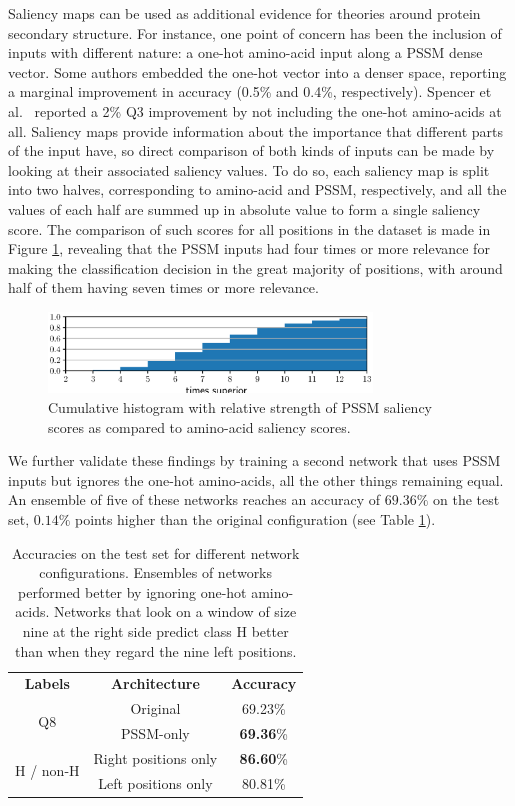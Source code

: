 \documentclass{article}
\begin{document}
Saliency maps can be used as additional evidence for theories around protein secondary structure.
For instance, one point of concern has been the inclusion of inputs with different nature: a one-hot amino-acid input along a PSSM dense vector.
Some authors \cite{Li2016,Zhou2018} embedded the one-hot vector into a denser space, reporting a marginal improvement in accuracy (0.5\% and 0.4\%, respectively).
Spencer et al.~\cite{Spencer2015} reported a 2\% Q3 improvement by not including the one-hot amino-acids at all.
Saliency maps provide information about the importance that different parts of the input have, so direct comparison of both kinds of inputs can be made by looking at their associated saliency values.
To do so, each saliency map is split into two halves, corresponding to amino-acid and PSSM, respectively, and all the values of each half are summed up in absolute value to form a single saliency score.
The comparison of such scores for all positions in the dataset is made in Figure \ref{fig:aa_pssm}, revealing that the PSSM inputs had four times or more relevance for making the classification decision in the great majority of positions, with around half of them having seven times or more relevance.
\begin{figure}
	\centering
	\centerline{\includegraphics[width=8.6cm]{aa_pssm}}
	\caption{Cumulative histogram with relative strength of PSSM saliency scores as compared to amino-acid saliency scores.}
	\label{fig:aa_pssm}
\end{figure}
We further validate these findings by training a second network that uses PSSM inputs but ignores the one-hot amino-acids, all the other things remaining equal.
An ensemble of five of these networks reaches an accuracy of $69.36\%$ on the test set, $0.14\%$ points higher than the original configuration (see Table \ref{table:res}).
\begin{table}
	\centering
	\begin{tabular}{c|c|c}
		\textbf{Labels} 	& \textbf{Architecture} & \textbf{Accuracy} \\
		\multirow{2}{*}{Q8} & Original 			& 69.23\% \\
		& PSSM-only 		& \textbf{69.36}\% \\ \hline
		\multirow{2}{*}{H / non-H} & Right positions only & \textbf{86.60}\% \\
		& Left positions only & 80.81\%
	\end{tabular}
	\caption{Accuracies on the test set for different network configurations.
		Ensembles of networks performed better by ignoring one-hot amino-acids.
		Networks that look on a window of size nine at the right side predict class H better than when they regard the nine left positions.}
	\label{table:res}
\end{table}
\end{document}

